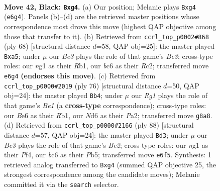 \documentclass[11pt]{article}
\begin{document}
\clearpage

\begin{figure}[p]\centering
\begin{subfigure}{0.46\textwidth}\centering
\resizebox{\linewidth}{!}{%
\newchessgame
\chessboard[
  setfen={6r1/r7/p1Bnbk2/B5p1/5pP1/PP6/1K5P/R2R2N1 b - - 2 42},
  showmover=false,
  pgfstyle=straightmove, color=movearrow, markmove={e6-g4}
]}
\caption{}
\end{subfigure}\hfill
\begin{subfigure}{0.46\textwidth}\centering
\resizebox{\linewidth}{!}{%
\newchessgame
\chessboard[
  setfen={1r1r2k1/5pp1/1n4p1/pP6/2pP3P/2B2P2/2R3P1/1R4K1 w - - 2 35},
  showmover=false,
  pgfstyle=straightmove, color=movearrow, markmove={c3-a5}
]}
\caption{}
\end{subfigure}
\\[4pt]
\begin{subfigure}{0.46\textwidth}\centering
\resizebox{\linewidth}{!}{%
\newchessgame
\chessboard[
  setfen={8/r3bk2/r1p3p1/1p6/4p3/4P2P/P1R2PK1/1R2B3 w - - 0 39},
  showmover=false,
  pgfstyle=straightmove, color=movearrow, markmove={e1-b4}
]}
\caption{}
\end{subfigure}\hfill
\begin{subfigure}{0.46\textwidth}\centering
\resizebox{\linewidth}{!}{%
\newchessgame
\chessboard[
  setfen={8/p1r3r1/4pk2/1P1b3p/R4P2/R3K3/4B2P/8 w - - 0 45},
  showmover=false,
  pgfstyle=straightmove, color=movearrow, markmove={e2-d3}
]}
\caption{}
\end{subfigure}
\caption{\textbf{Move 42, Black: \texttt{Bxg4}.} (a) Our position; Melanie plays \texttt{Bxg4} (\texttt{e6g4}). Panels (b)--(d) are the retrieved master positions whose correspondence most drove this move (highest QAP objective among those that transfer to it). (b) Retrieved from \texttt{ccrl\_top\_p0002\#868} (ply 68) [structural distance $d$=58, QAP obj=25]: the master played \texttt{Bxa5}; under $\mu$ our \emph{Be3} plays the role of that game's \emph{Bc3}; cross-type roles: our \emph{n}g1 as their \emph{R}b1, our \emph{b}c6 as their \emph{R}c2; transferred move \texttt{e6g4} \textbf{(endorses this move)}. (c) Retrieved from \texttt{ccrl\_top\_p0000\#2019} (ply 76) [structural distance $d$=50, QAP obj=24]: the master played \texttt{Bb4}; under $\mu$ our \emph{Rg1} plays the role of that game's \emph{Be1} (a \textbf{cross-type} correspondence); cross-type roles: our \emph{B}e6 as their \emph{R}b1, our \emph{N}d6 as their \emph{P}a2; transferred move \texttt{g8a8}. (d) Retrieved from \texttt{ccrl\_top\_p0000\#2166} (ply 88) [structural distance $d$=57, QAP obj=24]: the master played \texttt{Bd3}; under $\mu$ our \emph{Be3} plays the role of that game's \emph{Be2}; cross-type roles: our \emph{n}g1 as their \emph{P}f4, our \emph{b}c6 as their \emph{P}b5; transferred move \texttt{e6f5}. Synthesis: 1 retrieved analog transferred to \texttt{Bxg4} (summed QAP objective 25, the strongest correspondence among the candidate moves); Melanie committed it via the \texttt{search} selector.}
\label{fig:thought-m83}
\end{figure}
\end{document}
